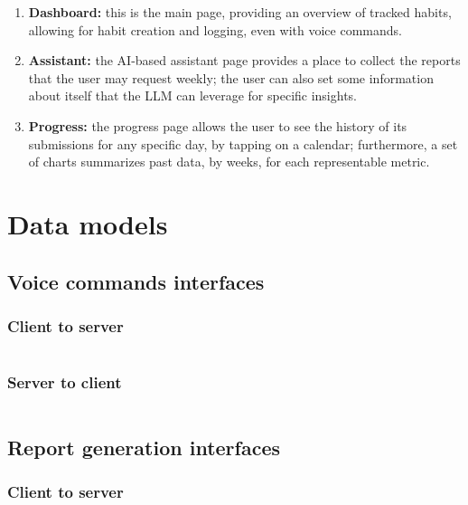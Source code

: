 \documentclass{article}
\begin{document}
\begin{enumerate}
	\item \textbf{Dashboard:} this is the main page, providing an overview of tracked habits, allowing for habit creation and logging, even with voice commands.
	\item \textbf{Assistant:} the AI-based assistant page provides a place to collect the reports that the user may request weekly; the user can also set some information about itself that the LLM can leverage for specific insights.
	\item \textbf{Progress:} the progress page allows the user to see the history of its submissions for any specific day, by tapping on a calendar; furthermore, a set of charts summarizes past data, by weeks, for each representable metric.
\end{enumerate}


\newpage
\section{Data models}

\subsection{Voice commands interfaces}

\subsubsection{Client to server}
\inputminted[fontsize=\tiny, linenos, breaklines]{json}{data-models/speech-client-to-server.json}

\newpage
\subsubsection{Server to client}
\inputminted[fontsize=\tiny, linenos, breaklines]{json}{data-models/speech-server-to-client.json}

\newpage
\subsection{Report generation interfaces}

\subsubsection{Client to server}
\inputminted[fontsize=\tiny, linenos, breaklines]{json}{data-models/report-client-to-server.json}
\end{document}
